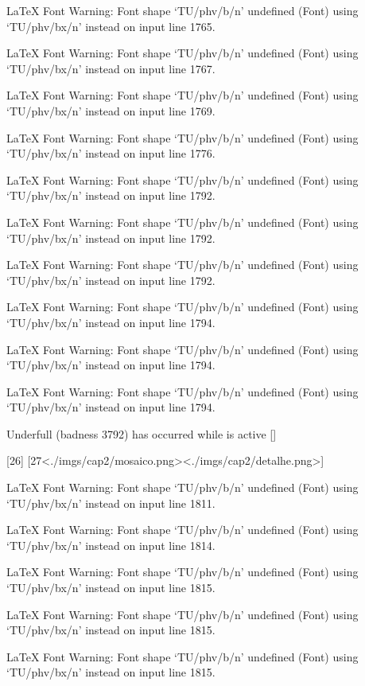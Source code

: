 LaTeX Font Warning: Font shape `TU/phv/b/n' undefined
(Font)              using `TU/phv/bx/n' instead on input line 1765.


LaTeX Font Warning: Font shape `TU/phv/b/n' undefined
(Font)              using `TU/phv/bx/n' instead on input line 1767.


LaTeX Font Warning: Font shape `TU/phv/b/n' undefined
(Font)              using `TU/phv/bx/n' instead on input line 1769.


LaTeX Font Warning: Font shape `TU/phv/b/n' undefined
(Font)              using `TU/phv/bx/n' instead on input line 1776.


LaTeX Font Warning: Font shape `TU/phv/b/n' undefined
(Font)              using `TU/phv/bx/n' instead on input line 1792.


LaTeX Font Warning: Font shape `TU/phv/b/n' undefined
(Font)              using `TU/phv/bx/n' instead on input line 1792.


LaTeX Font Warning: Font shape `TU/phv/b/n' undefined
(Font)              using `TU/phv/bx/n' instead on input line 1792.


LaTeX Font Warning: Font shape `TU/phv/b/n' undefined
(Font)              using `TU/phv/bx/n' instead on input line 1794.


LaTeX Font Warning: Font shape `TU/phv/b/n' undefined
(Font)              using `TU/phv/bx/n' instead on input line 1794.


LaTeX Font Warning: Font shape `TU/phv/b/n' undefined
(Font)              using `TU/phv/bx/n' instead on input line 1794.


Underfull \vbox (badness 3792) has occurred while \output is active []

[26] [27<./imgs/cap2/mosaico.png><./imgs/cap2/detalhe.png>]

LaTeX Font Warning: Font shape `TU/phv/b/n' undefined
(Font)              using `TU/phv/bx/n' instead on input line 1811.


LaTeX Font Warning: Font shape `TU/phv/b/n' undefined
(Font)              using `TU/phv/bx/n' instead on input line 1814.


LaTeX Font Warning: Font shape `TU/phv/b/n' undefined
(Font)              using `TU/phv/bx/n' instead on input line 1815.


LaTeX Font Warning: Font shape `TU/phv/b/n' undefined
(Font)              using `TU/phv/bx/n' instead on input line 1815.


LaTeX Font Warning: Font shape `TU/phv/b/n' undefined
(Font)              using `TU/phv/bx/n' instead on input line 1815.



